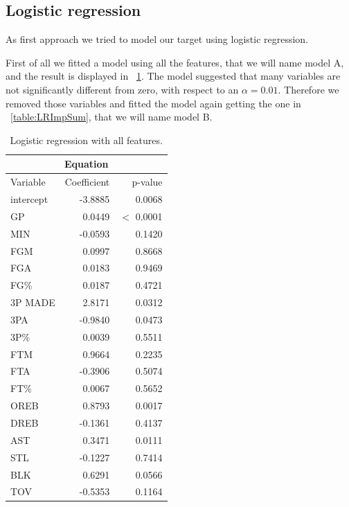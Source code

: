 \subsection{Logistic regression}

As first approach we tried to model our target using logistic regression.

First of all we fitted a model using all the features, that we will name model A, and the result is displayed in \Tab~\ref{table:LRAllSum}. The model suggested that many variables are not significantly different from zero, with respect to an $\alpha = 0.01$. Therefore we removed those variables and fitted the model again getting the one in \Tab~\ref{table:LRImpSum}, that we will name model B.

\begin{table}[H]
	\begin{subtable}[h]{0.3\textwidth}
		\centering
		\begin{tabular}{|| l | r | r ||} 
			\hline
			\multicolumn{3}{|c|}{Equation} \\
			\hline
			Variable & Coefficient & p-value \\
			\hline
			intercept & -3.8885 & 0.0068 \\
			GP & 0.0449 & $<$ 0.0001 \\
			MIN & -0.0593 & 0.1420 \\
			FGM & 0.0997 & 0.8668 \\
			FGA & 0.0183 & 0.9469 \\
			FG\% & 0.0187 & 0.4721 \\
			3P MADE & 2.8171 & 0.0312 \\
			3PA & -0.9840 & 0.0473 \\
			3P\% & 0.0039 & 0.5511 \\
			FTM & 0.9664 & 0.2235 \\
			FTA & -0.3906 & 0.5074 \\
			FT\% & 0.0067 & 0.5652 \\
			OREB & 0.8793 & 0.0017 \\
			DREB & -0.1361 & 0.4137 \\
			AST & 0.3471 & 0.0111 \\
			STL & -0.1227 & 0.7414 \\
			BLK & 0.6291 & 0.0566 \\				
			TOV & -0.5353 & 0.1164 \\		
			\hline
		\end{tabular}
		\caption{Logistic regression with all features.}
		\label{table:LRAllSum}
	\end{subtable}

\end{table}
